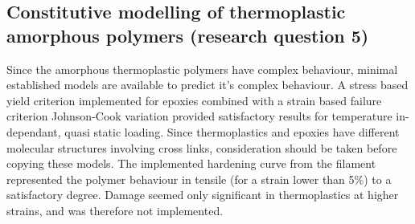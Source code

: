 \subsection{Constitutive modelling of thermoplastic amorphous polymers (research question 5)}
Since the amorphous thermoplastic polymers have complex behaviour, minimal established models are available to predict it's complex behaviour.  A stress based yield criterion implemented for epoxies combined with a strain based failure criterion Johnson-Cook variation provided satisfactory results for temperature in-dependant, quasi static loading. Since thermoplastics and epoxies have different molecular structures involving cross links, consideration should be taken before copying these models. The implemented hardening curve from the filament represented the polymer behaviour in tensile (for a strain lower than 5\%) to a satisfactory degree. Damage seemed only significant in thermoplastics at higher strains, and was therefore not implemented. 



